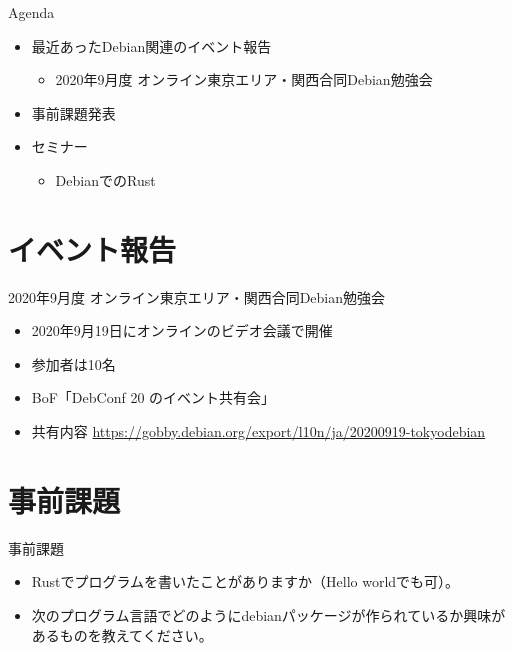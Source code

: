 \begin{frame}{Agenda}
 \begin{minipage}[t]{0.45\hsize}
  \begin{itemize}
  \item 最近あったDebian関連のイベント報告
    \begin{itemize}
    \item 2020年9月度 オンライン東京エリア・関西合同Debian勉強会
    \end{itemize}
  \item 事前課題発表
  \end{itemize}
 \end{minipage}
 \begin{minipage}[t]{0.45\hsize}
   \begin{itemize}
   \item セミナー
     \begin{itemize}
     \item DebianでのRust
     \end{itemize}
  \end{itemize}
 \end{minipage}
\end{frame}

\section{イベント報告}

\begin{frame}{2020年9月度 オンライン東京エリア・関西合同Debian勉強会}
\begin{itemize}
\item 2020年9月19日にオンラインのビデオ会議で開催
\item 参加者は10名
\item BoF「DebConf 20 のイベント共有会」
\item 共有内容 \url{https://gobby.debian.org/export/l10n/ja/20200919-tokyodebian}
\end{itemize}
\end{frame}


\section{事前課題}


\begin{frame}{事前課題}
  \begin{itemize}
  \item Rustでプログラムを書いたことがありますか（Hello worldでも可）。
  \item 次のプログラム言語でどのようにdebianパッケージが作られているか興味があるものを教えてください。
  \end{itemize}
\end{frame}


